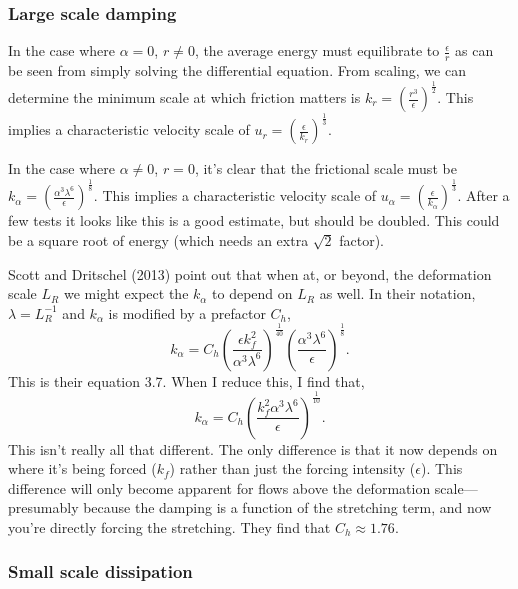 \documentclass[11pt]{article}
\begin{document}
\subsubsection{Large scale damping}

In the case where $\alpha=0$, $r \neq 0$, the average energy must equilibrate to $\frac{\epsilon}{r}$ as can be seen from simply solving the differential equation. From scaling, we can determine the minimum scale at which friction matters is $k_r = \left( \frac{r^3}{\epsilon} \right)^{\frac{1}{2}}$. This implies a characteristic velocity scale of $u_r=\left(\frac{\epsilon}{k_r}\right)^\frac{1}{3}$.

In the case where $\alpha \neq 0$, $r = 0$, it's clear that the frictional scale must be $k_{\alpha}= \left( \frac{\alpha^3 \lambda^6}{\epsilon} \right)^{\frac{1}{8}}$. This implies a characteristic velocity scale of $u_\alpha=\left(\frac{\epsilon}{k_\alpha}\right)^\frac{1}{3}$. After a few tests it looks like this is a good estimate, but should be doubled. This could be a square root of energy (which needs an extra $\sqrt{2}$ factor).

Scott and Dritschel (2013) point out that when at, or beyond, the deformation scale $L_R$ we might expect the $k_\alpha$ to depend on $L_R$ as well. In their notation, $\lambda = L_R^{-1}$ and $k_\alpha$ is modified by a prefactor $C_h$,
\begin{equation}
k_{\alpha}= C_h \left( \frac{\epsilon k_f^2}{\alpha^3 \lambda^6} \right)^{\frac{1}{40}} \left( \frac{\alpha^3 \lambda^6}{\epsilon} \right)^{\frac{1}{8}}.
\end{equation}
This is their equation 3.7. When I reduce this, I find that,
\begin{equation}
k_{\alpha}= C_h \left( \frac{ k_f^2 \alpha^3 \lambda^6}{\epsilon} \right)^{\frac{1}{10}}.
\end{equation}
This isn't really all that different. The only difference is that it now depends on where it's being forced ($k_f$) rather than just the forcing intensity ($\epsilon$). This difference will only become apparent for flows above the deformation scale---presumably because the damping is a function of the stretching term, and now you're directly forcing the stretching. They find that $C_h\approx1.76$.

\subsubsection{Small scale dissipation}
\end{document}
